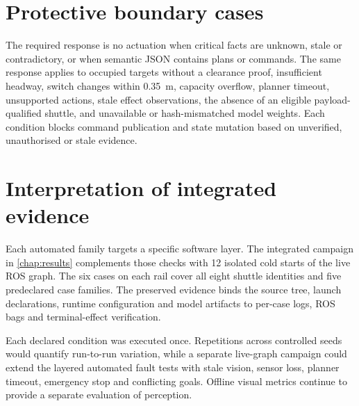 \section{Protective boundary cases}

The required response is no actuation when critical facts are unknown, stale or
contradictory, or when semantic JSON contains plans or commands. The same
response applies to occupied targets without a clearance proof,
insufficient headway, switch changes within \SI{0.35}{m}, capacity overflow,
planner timeout, unsupported actions, stale effect observations, the absence of
an eligible payload-qualified shuttle, and unavailable or hash-mismatched model
weights. Each condition blocks command publication and state mutation based on
unverified, unauthorised or stale evidence.

\section{Interpretation of integrated evidence}

Each automated family targets a specific software layer. The integrated
campaign in \cref{chap:results} complements those checks with 12 isolated
cold starts of the live ROS graph. The six cases on each rail cover all eight
shuttle identities and five predeclared case families. The preserved evidence
binds the source tree, launch declarations, runtime configuration and model
artifacts to per-case logs, ROS bags and terminal-effect verification.

Each declared condition was executed once. Repetitions across controlled seeds
would quantify run-to-run variation, while a separate live-graph campaign could
extend the layered automated fault tests with stale vision, sensor loss, planner
timeout, emergency stop and conflicting goals.
Offline visual metrics continue to provide a separate evaluation of perception.
